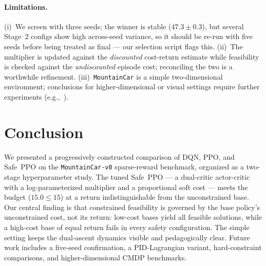 \documentclass{article}
\begin{document}
\paragraph{Limitations.}
(i)~We screen with three seeds; the winner is stable ($47.3 \pm 0.3$), but several Stage~2 configs
show high across-seed variance, so it should be re-run with five seeds before being treated as
final --- our selection script flags this.
(ii)~The multiplier is updated against the \emph{discounted} cost-return estimate while feasibility
is checked against the \emph{undiscounted} episode cost; reconciling the two is a worthwhile
refinement.
(iii)~\texttt{MountainCar} is a simple two-dimensional environment; conclusions for
higher-dimensional or visual settings require further experiments
(e.g.,~\citealp{ray2019benchmarking}).


\section{Conclusion}
\label{sec:conclusion}

We presented a progressively constructed comparison of DQN, PPO, and Safe~PPO on the
\texttt{MountainCar-v0} sparse-reward benchmark, organized as a two-stage hyperparameter study. The
tuned Safe~PPO --- a dual-critic actor-critic with a log-parameterized multiplier and a proportional
soft cost --- meets the budget ($15.0 \le 15$) at a return indistinguishable from the unconstrained
base. Our central finding is that constrained feasibility is governed by the base policy's
unconstrained cost, not its return: low-cost bases yield all feasible solutions, while a high-cost
base of equal return fails in every safety configuration. The simple setting keeps the dual-ascent
dynamics visible and pedagogically clear. Future work includes a five-seed confirmation, a
PID-Lagrangian variant, hard-constraint comparisons, and higher-dimensional CMDP benchmarks.

\setlength{\bibsep}{2pt plus 0.3ex}
{\footnotesize


}
\end{document}
